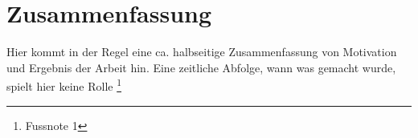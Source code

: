 \section*{Zusammenfassung}
Hier kommt in der Regel eine ca. halbseitige Zusammenfassung von Motivation und
Ergebnis der Arbeit hin. Eine zeitliche Abfolge, wann was gemacht wurde, spielt hier
keine Rolle
\footnote{Fussnote 1}